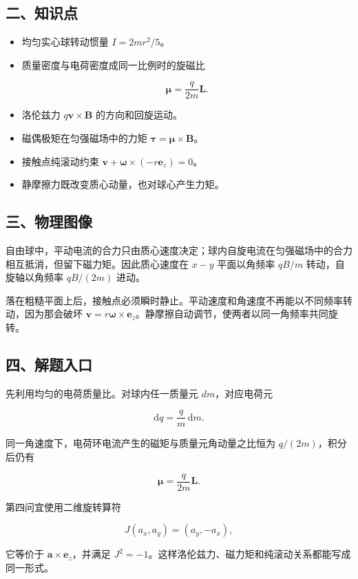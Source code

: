 \documentclass[12pt,a4paper,UTF8]{ctexart}
\begin{document}
\subsection{二、知识点}\label{ux4e8cux77e5ux8bc6ux70b9-2}

\begin{itemize}
\item
  均匀实心球转动惯量 \(I=2mr^2/5\)。
\item
  质量密度与电荷密度成同一比例时的旋磁比

  \[\bm\mu=\frac{q}{2m}\bm L.\]
\item
  洛伦兹力 \(q\bm v\times\bm B\) 的方向和回旋运动。
\item
  磁偶极矩在匀强磁场中的力矩 \(\bm\tau=\bm\mu\times\bm B\)。
\item
  接触点纯滚动约束 \(\bm v+\bm\omega\times(-r\bm e_z)=0\)。
\item
  静摩擦力既改变质心动量，也对球心产生力矩。
\end{itemize}

\subsection{三、物理图像}\label{ux4e09ux7269ux7406ux56feux50cf-2}

自由球中，平动电流的合力只由质心速度决定；球内自旋电流在匀强磁场中的合力相互抵消，但留下磁力矩。因此质心速度在
\(x-y\) 平面以角频率 \(qB/m\) 转动，自旋轴以角频率 \(qB/(2m)\) 进动。

落在粗糙平面上后，接触点必须瞬时静止。平动速度和角速度不再能以不同频率转动，因为那会破坏
\(\bm v=r\bm\omega\times\bm e_z\)。静摩擦自动调节，使两者以同一角频率共同旋转。

\subsection{四、解题入口}\label{ux56dbux89e3ux9898ux5165ux53e3-2}

先利用均匀的电荷质量比。对球内任一质量元 \(dm\)，对应电荷元

\[\mathrm{d}q=\frac qm\,\mathrm{d}m.\]

同一角速度下，电荷环电流产生的磁矩与质量元角动量之比恒为
\(q/(2m)\)，积分后仍有

\[\bm\mu=\frac{q}{2m}\bm L.\]

第四问宜使用二维旋转算符

\[J(a_x,a_y)=(a_y,-a_x),\]

它等价于 \(\bm a\times\bm e_z\)，并满足
\(J^2=-1\)。这样洛伦兹力、磁力矩和纯滚动关系都能写成同一形式。
\end{document}
